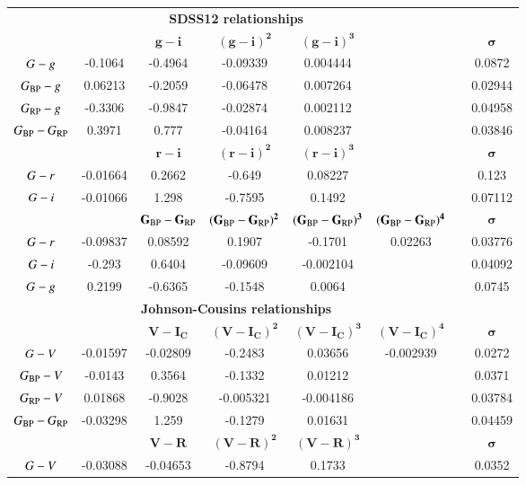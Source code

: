 \documentclass{aa}
\newcommand{\gbp}{\ensuremath{G_{\rm BP}}\xspace}
\newcommand{\grp}{\ensuremath{G_{\rm RP}}\xspace}
\newcommand{\bprp}{\ensuremath{G_{\rm BP}-G_{\rm RP}}\xspace}
\begin{document}
\begin{appendix}
\begin{table}
\begin{center}
\begin{tabular}{c c c c c c c c}
\hline
\multicolumn{7}{c}{\textbf{SDSS12 relationships}}\\
                   &           & $\mathbf{g-i}$      & $\mathbf{(g-i)^{2}}$      & $\mathbf{(g-i)^{3}}$         &&& $\mathbf{\sigma}$\\	
$G-g$   	   & -0.1064  &-0.4964 &-0.09339 & 0.004444  &&&0.0872 \\ 
$\gbp-g$          &  0.06213 &-0.2059 &-0.06478 & 0.007264 &&& 0.02944\\
$\grp-g$          & -0.3306 &-0.9847 &-0.02874 & 0.002112 &&& 0.04958\\
$\bprp$         &  0.3971 & 0.777 &-0.04164 & 0.008237 &&& 0.03846\\

            	   &	   & $\mathbf{r-i}$	 & $\mathbf{(r-i)^{2}}$      & $\mathbf{(r-i)^{3}}$	    &&& $\mathbf{\sigma}$ \\   
$G-r$   	   & -0.01664 & 0.2662 &-0.649  & 0.08227   &&& 0.123 \\
$G-i$   	   & -0.01066  & 1.298  &-0.7595  & 0.1492   &&& 0.07112 \\
            	   &	   & $\mathbf{\bprp}$ & $\mathbf{(\bprp)^{2}}$ & $\mathbf{(\bprp)^{3}}$ & $\mathbf{(\bprp)^{4}}$  && $\mathbf{\sigma}$ \\   
$G-r$   	   & -0.09837	& 0.08592 &0.1907 &-0.1701 & 0.02263 && 0.03776 \\
$G-i$   	   & -0.293	& 0.6404 &-0.09609  & -0.002104	& && 0.04092 \\
$G-g$   	   &  0.2199	&-0.6365 &-0.1548  & 0.0064 & && 0.0745  \\
\hline
\multicolumn{7}{c}{\textbf{Johnson-Cousins relationships}}\\
& & $\mathbf{V-I_C}$ & $\mathbf{(V-I_C)^{2}}$ & $\mathbf{(V-I_C)^{3}}$ & $\mathbf{(V-I_C)^{4}}$ &&    $\mathbf{\sigma}$ \\  
$G-V$           & -0.01597 & -0.02809 &-0.2483 & 0.03656 &-0.002939 && 0.0272 \\
$\gbp-V$       & -0.0143 & 0.3564 &-0.1332 & 0.01212 & && 0.0371 \\
$\grp-V$       &  0.01868 &-0.9028 &-0.005321 &-0.004186 & && 0.03784\\
$\bprp$   & -0.03298 & 1.259 &-0.1279 & 0.01631 & && 0.04459\\
& & $\mathbf{V-R}$ & $\mathbf{(V-R)^{2}}$ & $\mathbf{(V-R)^{3}}$ &&&     $\mathbf{\sigma}$ \\  
$G-V$           & -0.03088 &-0.04653 &-0.8794 & 0.1733 &&&  0.0352 \\

\end{tabular}
\end{center}
\end{table}
\end{appendix}
\end{document}
